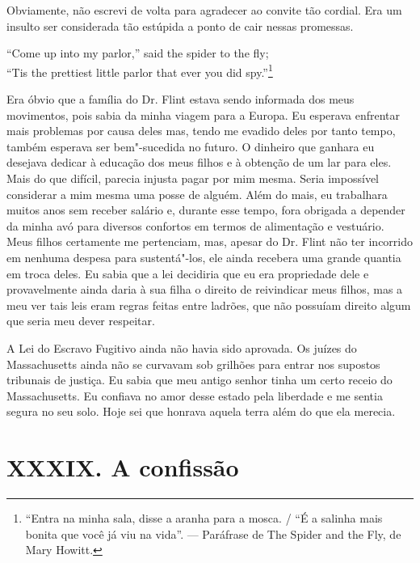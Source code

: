Obviamente, não escrevi de volta para
agradecer ao convite tão cordial. Era um insulto ser considerada tão
estúpida a ponto de cair nessas promessas.

``Come up into my parlor,'' said the spider to the fly;\\
``Tis the prettiest little parlor that ever you did spy.''\footnote{``Entra
na minha sala, disse a
aranha para a mosca. / ``É a salinha mais bonita que você já viu na
vida''. --- Paráfrase de The Spider and the Fly, de Mary Howitt.}

Era óbvio que a família do Dr. Flint
estava sendo informada dos meus movimentos, pois sabia da minha viagem
para a Europa. Eu esperava enfrentar mais problemas por causa deles mas,
tendo me evadido deles por tanto tempo, também esperava ser bem"-sucedida
no futuro. O dinheiro que ganhara eu desejava dedicar à educação dos
meus filhos e à obtenção de um lar para eles. Mais do que difícil,
parecia injusta pagar por mim mesma. Seria impossível considerar a mim
mesma uma posse de alguém. Além do mais, eu trabalhara muitos anos sem
receber salário e, durante esse tempo, fora obrigada a depender da minha
avó para diversos confortos em termos de alimentação e vestuário. Meus
filhos certamente me pertenciam, mas, apesar do Dr. Flint não ter
incorrido em nenhuma despesa para sustentá"-los, ele ainda recebera uma
grande quantia em troca deles. Eu sabia que a lei decidiria que eu era
propriedade dele e provavelmente ainda daria à sua filha o direito de
reivindicar meus filhos, mas a meu ver tais leis eram regras feitas
entre ladrões, que não possuíam direito algum que seria meu dever
respeitar.

A Lei do Escravo Fugitivo ainda não
havia sido aprovada. Os juízes do Massachusetts ainda não se curvavam
sob grilhões para entrar nos supostos tribunais de justiça. Eu sabia que
meu antigo senhor tinha um certo receio do Massachusetts. Eu confiava no
amor desse estado pela liberdade e me sentia segura no seu solo. Hoje
sei que honrava aquela terra além do que ela merecia.

\chapter{XXXIX. A confissão}


